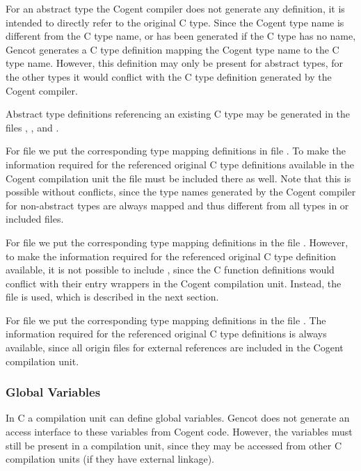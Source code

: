 For an abstract type the Cogent compiler does not generate any definition, it is intended to directly refer to the original
C type. Since the Cogent type name is different from the C type name, or has been generated if the C type has no name,
Gencot generates a C type definition mapping the Cogent type name to the C type name.
However, this definition may only be present for abstract types, for the other types it would conflict with the C type
definition generated by the Cogent compiler. 

Abstract type definitions referencing an existing C type may be generated in the files , 
, and . 

For file  we put the corresponding 
type mapping definitions in file . To make the information required for the referenced original 
C type definitions available in the Cogent compilation unit the file  must be 
included there as well. Note that this is 
possible without conflicts, since the type names generated by the Cogent compiler for non-abstract types are always
mapped and thus different from all types in  or included files.

For file  we put the corresponding
type mapping definitions in the file . However, to make the information required for the 
referenced original C type definition
available, it is not possible to include , since the C function definitions would conflict with their
entry wrappers in the Cogent compilation unit. Instead, the file  is used, which is described in the
next section.

For file  we put the corresponding
type mapping definitions in the file . The information required for the referenced original C type
definitions is always available, since all origin files for external references are included in the Cogent compilation unit.

\subsubsection{Global Variables}

In C a compilation unit can define global variables. Gencot does not generate an access interface to these variables
from Cogent code. However, the variables must still be present in a compilation unit, since they may be accessed
from other C compilation units (if they have external linkage). 

